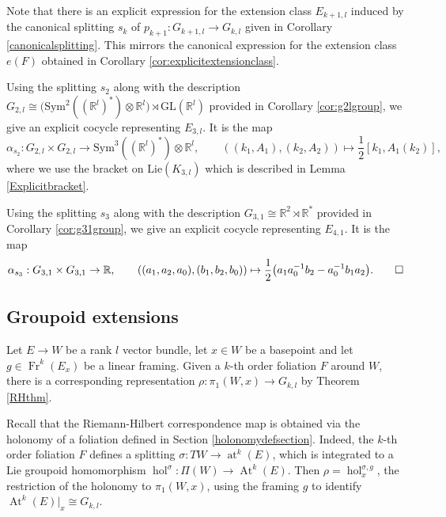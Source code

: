 \documentclass[10pt]{amsart}
\newcommand{\hol}{{\operatorname{hol}}}
\newcommand{\Fr}{{\operatorname{Fr}}}
\DeclareMathOperator{\At}{At}
\DeclareMathOperator{\at}{at}
\numberwithin{theoremalpha}{section}
\numberwithin{equation}{section}
\numberwithin{definition}{section}
\numberwithin{theorem}{section}
\numberwithin{proposition}{section}
\numberwithin{lemma}{section}
\numberwithin{example}{section}
\numberwithin{remark}{section}
\numberwithin{corollary}{section}
\numberwithin{question}{section}
\numberwithin{problem}{section}
\numberwithin{assumption}{section}
\theoremstyle{named}
\numberwithin{equation}{section}
\begin{document}
Note that there is an explicit expression for the extension class $E_{k+1, l}$ induced by the canonical splitting $s_{k}$ of $p_{k+1} : G_{k+1, l} \to G_{k,l}$ given in Corollary \ref{canonicalsplitting}. This mirrors the canonical expression for the extension class $e(F)$ obtained in Corollary \ref{cor:explicitextensionclass}. 

\begin{example}[$E_{3,l}$]
Using the splitting $s_2$ along with the description $G_{2,l} \cong \big( \mathrm{Sym}^{2}( (\mathbb{R}^l)^* ) \otimes \mathbb{R}^l \big) \rtimes \mathrm{GL}(\mathbb{R}^l)$ provided in Corollary \ref{cor:g2lgroup}, we give an explicit cocycle representing $E_{3,l}$. It is the map 
\[
\alpha_{s_2} : G_{2,l} \times G_{2,l} \to \mathrm{Sym}^{3}( (\mathbb{R}^l)^* ) \otimes \mathbb{R}^l, \qquad ( (k_1, A_1), (k_2, A_2)) \mapsto \frac{1}{2}[k_1, A_{1}(k_2)],
\]
where we use the bracket on $\mathrm{Lie}(K_{3,l})$ which is described in Lemma \ref{Explicitbracket}. 
\end{example}
\begin{example}[$E_{4,1}$] \label{Ex:explicitext41}
Using the splitting $s_3$ along with the description $G_{3,1} \cong \mathbb{R}^2 \rtimes \mathbb{R}^*$ provided in Corollary \ref{cor:g31group}, we give an explicit cocycle representing $E_{4,1}$. It is the map 
\[
\alpha_{s_{3}}: G_{3,1} \times G_{3,1} \to \mathbb{R}, \qquad ((a_{1}, a_{2}, a_{0}), (b_{1}, b_{2}, b_{0})) \mapsto \frac{1}{2}\big(a_1 a_0^{-1}b_2 - a_0^{-1}b_{1}a_{2} \big). \hfill \qedhere
\]
\end{example}

\subsection{Groupoid extensions} \label{ssec:groupoidext}
Let $E \to W$ be a rank $l$ vector bundle, let $x \in W$ be a basepoint and let $g \in \Fr^k(E_{x})$ be a linear framing. Given a $k$-th order foliation $F$ around $W$, there is a corresponding representation $\rho: \pi_{1}(W, x) \to G_{k,l}$ by Theorem \ref{RHthm}. 

Recall that the Riemann-Hilbert correspondence map is obtained via the holonomy of a foliation defined in Section \ref{holonomydefsection}. Indeed, the $k$-th order foliation $F$ defines a splitting $\sigma: TW \to \at^{k}(E)$, which is integrated to a Lie groupoid homomorphism $\hol^{\sigma} : \Pi(W) \to \At^{k}(E)$. Then $\rho = \hol_{x}^{\sigma, g}$, the restriction of the holonomy to $\pi_{1}(W,x)$, using the framing $g$ to identify $\At^k(E)|_{x} \cong G_{k,l}$. 
\end{document}
